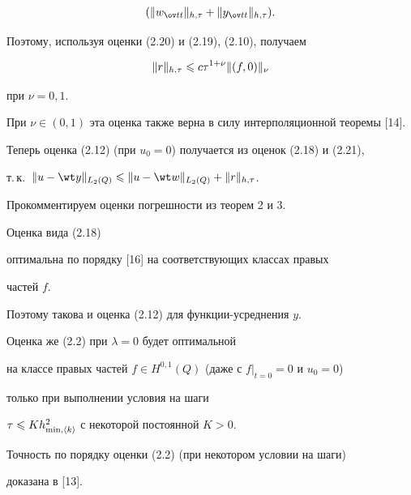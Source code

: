 \begin{pf}
\begin{gather*}
(\|w_{\ov tt}\|_{h,\tau}+\|y_{\ov tt}\|_{h,\tau}).


\end{gather*}


Поэтому, используя оценки (2.20) и (2.19), (2.10), получаем


\begin{equation}


\|r\|_{h,\tau}\lee c \tau^{1+\nu}\|(f,0)\|_{\nu}


\end{equation}


при $\nu=0,1$.


При $\nu\in (0,1)$ эта оценка также верна в силу интерполяционной теоремы [14].


Теперь оценка (2.12) (при $u_0=0$) получается из оценок (2.18) и (2.21),


т.\,к.~$\|u-\wt y\|_{L_2(Q)}\lee\|u-\wt w\|_{L_2(Q)}+\|r\|_{h,\tau}$.


\end{pf}





Прокомментируем оценки погрешности из теорем 2 и 3.


Оценка вида (2.18)


оптимальна по порядку [16] на соответствующих классах правых


частей $f$.


Поэтому такова и оценка (2.12) для функции-усреднения $y$.


Оценка же (2.2) при $\lambda=0$ будет оптимальной


на классе правых частей $f\in H^{0,1}(Q)$ (даже с $f|_{t=0}=0$ и $u_0=0$)


только при выполнении условия на шаги 


$\tau\leqslant Kh_{\min,\langle k\rangle}^2$  с некоторой постоянной $K>0$.


Точность по порядку оценки (2.2) (при некотором условии на шаги)


доказана в [13].





